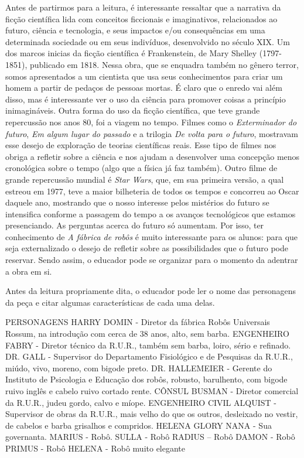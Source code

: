 \documentclass[11pt]{extarticle}
\begin{document}
Antes de partirmos para a leitura, é interessante ressaltar que a narrativa da ficção científica lida com conceitos ficcionais e imaginativos, relacionados ao futuro, ciência e tecnologia, e seus impactos e/ou consequências em uma determinada sociedade ou em seus indivíduos, desenvolvido no século XIX. Um dos marcos inicias da ficção científica é Frankenstein, de Mary Shelley (1797-1851), publicado em 1818. Nessa obra, que se enquadra também no gênero terror, somos apresentados a um cientista que usa seus conhecimentos para criar um homem a partir de pedaços de pessoas mortas. É claro que o enredo vai além disso, mas é interessante ver o uso da ciência para promover coisas a princípio inimagináveis. Outra forma do uso da ficção científica, que teve grande repercussão nos anos 80, foi a viagem no tempo. Filmes como o \textit{Exterminador do futuro}, \textit{Em algum lugar do passado} e a trilogia \textit{De volta para o futuro}, mostravam esse desejo de exploração de teorias científicas reais. Esse tipo de filmes nos obriga a refletir sobre a ciência e nos ajudam a desenvolver uma concepção menos cronológica sobre o tempo (algo que a física já faz também). Outro filme de grande repercussão mundial é \textit{Star Wars}, que, em sua primeira versão, a qual estreou em 1977, teve a maior bilheteria de todos os tempos e concorreu ao Oscar daquele ano, mostrando que o nosso interesse pelos mistérios do futuro se intensifica conforme a passagem do tempo a os avanços tecnológicos que estamos presenciando. As perguntas acerca do futuro só aumentam. Por isso, ter conhecimento de \textit{A fábrica de robôs} é muito interessante para os alunos: para que seja externalizado o desejo de refletir sobre as possibilidades que o futuro pode reservar. Sendo assim, o educador pode se organizar para o momento da adentrar a obra em si.



Antes da leitura propriamente dita, o educador pode ler o nome das personagens da peça e citar algumas características de cada uma delas.

PERSONAGENS 
HARRY DOMIN -  Diretor da fábrica Robôs Universais Rossum, na introdução com cerca de 38 anos, alto, sem barba.
 ENGENHEIRO FABRY -  Diretor técnico da R.U.R., também sem barba, loiro, sério e refinado. 
DR. GALL -  Supervisor do Departamento Fisiológico e de Pesquisas da R.U.R., miúdo, vivo, moreno, com bigode preto.
 DR. HALLEMEIER - Gerente do Instituto de Psicologia e Educação dos robôs, robusto, barulhento, com bigode ruivo inglês e cabelo ruivo cortado rente. 
CÔNSUL BUSMAN -  Diretor comercial da R.U.R., judeu gordo, calvo e míope. 
ENGENHEIRO CIVIL ALQUIST -  Supervisor de obras da R.U.R., mais velho do que os outros, desleixado no vestir, de cabelos e barba grisalhos e compridos. 
HELENA GLORY 
NANA - Sua governanta. 
MARIUS - Robô.
SULLA -  Robô
RADIUS – Robô
DAMON - Robô
PRIMUS - Robô
HELENA - Robô muito elegante
\end{document}
